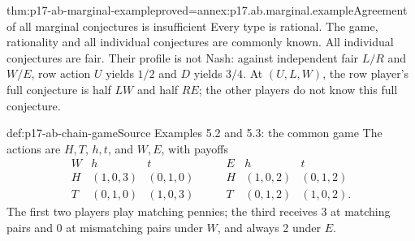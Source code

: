 \begin{hbtheorem}{thm:p17-ab-marginal-example}{proved=annex:p17.ab.marginal.example}{Agreement of all marginal conjectures is insufficient}
Every type is rational. The game, rationality and all individual
conjectures are commonly known. All individual conjectures are fair.
Their profile is not Nash: against independent fair \(L/R\) and
\(W/E\), row action \(U\) yields \(1/2\) and \(D\) yields \(3/4\).
At \((U,L,W)\), the row player's full conjecture is half \(LW\)
and half \(RE\); the other players do not know this full conjecture.
\end{hbtheorem}

\begin{hbdefinition}{def:p17-ab-chain-game}{Source Examples 5.2 and 5.3: the common game}
The actions are \(H,T\), \(h,t\), and \(W,E\), with payoffs
\[
 \begin{array}{c|cc}
 W&h&t\\\hline H&(1,0,3)&(0,1,0)\\T&(0,1,0)&(1,0,3)
 \end{array}
 \qquad
 \begin{array}{c|cc}
 E&h&t\\\hline H&(1,0,2)&(0,1,2)\\T&(0,1,2)&(1,0,2).
 \end{array}
\]
The first two players play matching pennies; the third receives
3 at matching pairs and 0 at mismatching pairs under \(W\),
and always 2 under \(E\).
\end{hbdefinition}

